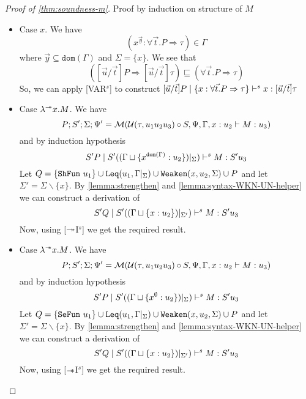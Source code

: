 \begin{proof}[Proof of \cref{thm:soundness-m}]
  Proof by induction on structure of $M$
  \begin{itemize}
  \item{Case $x$.}
    We have $$(x^{\vec{y}}:\forall \vec{t}. P \Rightarrow \tau) \in \Gamma$$ where $\vec{y} \subseteq \texttt{dom}(\Gamma)$ and $\Sigma = \{ x \}$. We see that
    $$([\vec{u}/\vec{t}]P \Rightarrow [\vec{u}/\vec{t}]\tau) \sqsubseteq (\forall \vec{t}. P \Rightarrow \tau)$$
    So, we can apply [VAR$^s$] to construct
    $[\vec{u}/\vec{t}]P \mid \{x:\forall \vec{t}. P \Rightarrow \tau \} \vdash^s x: [\vec{u}/\vec{t}]\tau$

  \item{Case $\lambda^{\twoheadrightarrow} x. M$.}
    We have $$P; S'; \Sigma; \Psi' = \mathcal{M}(\mathcal{U}(\tau, u_1 u_2 u_3) \circ S, \Psi, \Gamma, x:u_2 \vdash M: u_3)$$
    and by induction hypothesis $$S' P \mid S' ((\Gamma \sqcup \{ x^{\texttt{dom}(\Gamma)} : u_2 \})|_{\Sigma}) \vdash^s M : S' u_3$$
    Let $Q = \{\texttt{ShFun}\ u_1\} \cup \texttt{Leq}(u_1, \Gamma|_\Sigma) \cup \texttt{Weaken}(x, u_2, \Sigma) \cup P$
    and let $\Sigma' = \Sigma \backslash \{x\}$. By \cref{lemma:strengthen} and \cref{lemma:syntax-WKN-UN-helper} we can construct a
    derivation of $$S' Q \mid S'  ((\Gamma \sqcup \{x:u_2\})|_{\Sigma'}) \vdash^s M: S' u_3$$
    Now, using [$\twoheadrightarrow$I$^s$] we get the required result.

  \item{Case $\lambda^{\mathrel{-\mkern-6mu*}} x. M$.}
    We have $$P; S'; \Sigma; \Psi' = \mathcal{M}(\mathcal{U}(\tau, u_1 u_2 u_3) \circ S, \Psi, \Gamma, x:u_2 \vdash M: u_3)$$
    and by induction hypothesis $$S' P \mid S' ((\Gamma \sqcup \{ x^\emptyset : u_2 \})|_{\Sigma}) \vdash^s M : S' u_3$$
    Let $Q = \{\texttt{SeFun}\ u_1\} \cup \texttt{Leq}(u_1, \Gamma|_\Sigma) \cup \texttt{Weaken}(x, u_2, \Sigma) \cup P$
    and let $\Sigma' = \Sigma \backslash \{x\}$. By \cref{lemma:strengthen} and \cref{lemma:syntax-WKN-UN-helper} we can construct a
    derivation of $$S' Q \mid S'  ((\Gamma \sqcup \{x:u_2\})|_{\Sigma'}) \vdash^s M: S' u_3$$
    Now, using [$\mathrel{-\mkern-6mu*}$I$^s$] we get the required result.


\end{itemize}
\end{proof}

